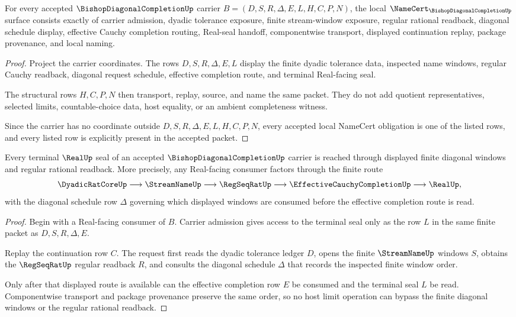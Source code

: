 \begin{theorem}
\label{thm:bishop-diagonal-completion-namecert-obligations}
For every accepted $\BishopDiagonalCompletionUp$ carrier $B=(D,S,R,\Delta,E,L,H,C,P,N)$, the local $\NameCert_{\BishopDiagonalCompletionUp}$ surface consists exactly of carrier admission, dyadic tolerance exposure, finite stream-window exposure, regular rational readback, diagonal schedule display, effective Cauchy completion routing, Real-seal handoff, componentwise transport, displayed continuation replay, package provenance, and local naming.
\end{theorem}
\begin{proof}
Project the carrier coordinates. The rows $D,S,R,\Delta,E,L$ display the finite dyadic tolerance data, inspected name windows, regular Cauchy readback, diagonal request schedule, effective completion route, and terminal Real-facing seal.

The structural rows $H,C,P,N$ then transport, replay, source, and name the same packet. They do not add quotient representatives, selected limits, countable-choice data, host equality, or an ambient completeness witness.

Since the carrier has no coordinate outside $D,S,R,\Delta,E,L,H,C,P,N$, every accepted local NameCert obligation is one of the listed rows, and every listed row is explicitly present in the accepted packet.
\end{proof}

\begin{theorem}
\label{thm:bishop-diagonal-completion-regular-seal-route}
Every terminal $\RealUp$ seal of an accepted $\BishopDiagonalCompletionUp$ carrier is reached through displayed finite diagonal windows and regular rational readback. More precisely, any Real-facing consumer factors through the finite route
$$
\DyadicRatCoreUp \longrightarrow \StreamNameUp \longrightarrow \RegSeqRatUp \longrightarrow \EffectiveCauchyCompletionUp \longrightarrow \RealUp ,
$$
with the diagonal schedule row $\Delta$ governing which displayed windows are consumed before the effective completion route is read.
\end{theorem}
\begin{proof}
Begin with a Real-facing consumer of $B$. Carrier admission gives access to the terminal seal only as the row $L$ in the same finite packet as $D,S,R,\Delta,E$.

Replay the continuation row $C$. The request first reads the dyadic tolerance ledger $D$, opens the finite $\StreamNameUp$ windows $S$, obtains the $\RegSeqRatUp$ regular readback $R$, and consults the diagonal schedule $\Delta$ that records the inspected finite window order.

Only after that displayed route is available can the effective completion row $E$ be consumed and the terminal seal $L$ be read. Componentwise transport and package provenance preserve the same order, so no host limit operation can bypass the finite diagonal windows or the regular rational readback.
\end{proof}

